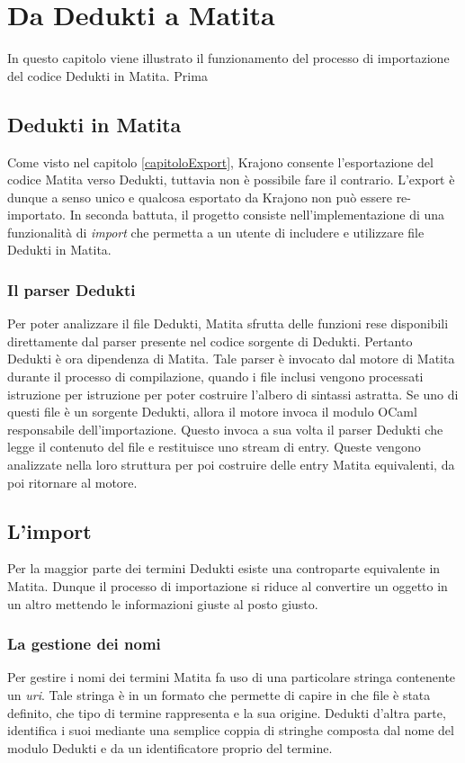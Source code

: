 \documentclass[12pt,a4paper]{mimosis}
\begin{document}
\chapter{Da Dedukti a Matita}
In questo capitolo viene illustrato il funzionamento del processo di importazione
del codice Dedukti in Matita. Prima %


\section{Dedukti in Matita}
Come visto nel capitolo \ref{capitoloExport}, Krajono consente l'esportazione del codice
Matita verso Dedukti, tuttavia non è possibile fare il contrario. L'export è dunque 
a senso unico e qualcosa esportato da Krajono non può essere re-importato. In seconda
battuta, il progetto consiste nell'implementazione di una funzionalità di \textit{import}
che permetta a un utente di includere e utilizzare file Dedukti in Matita.

\subsection{Il parser Dedukti}\label{sottoSezioneParserDedukti}
Per poter analizzare il file Dedukti, Matita sfrutta delle funzioni rese disponibili
direttamente dal parser presente nel codice sorgente di Dedukti. Pertanto Dedukti è
ora dipendenza di Matita. Tale parser è invocato dal motore di Matita durante il processo
di compilazione, quando i file inclusi vengono processati istruzione per istruzione 
per poter costruire l'albero di sintassi astratta. Se uno di questi file è un sorgente
Dedukti, allora il motore invoca il modulo OCaml responsabile dell'importazione. 
Questo invoca a sua volta il parser Dedukti che legge il contenuto del file e restituisce
uno stream di entry. Queste vengono analizzate nella loro struttura per poi costruire delle
entry Matita equivalenti, da poi ritornare al motore.

\section{L'import}
Per la maggior parte dei termini Dedukti esiste una controparte equivalente in Matita.
Dunque il processo di importazione si riduce al convertire un oggetto in un altro
mettendo le informazioni giuste al posto giusto. %

\subsection{La gestione dei nomi}
Per gestire i nomi dei termini Matita fa uso di una particolare stringa contenente un 
\textit{uri}. Tale stringa è in un formato che permette di capire in che file è stata
definito, che tipo di termine rappresenta e la sua origine. Dedukti d'altra parte, identifica
i suoi mediante una semplice coppia di stringhe composta dal nome del modulo Dedukti
e da un identificatore proprio del termine. 
\end{document}
